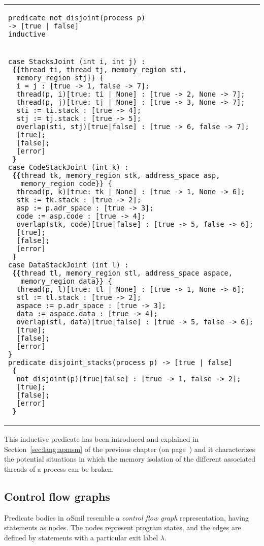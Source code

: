 \documentclass[11pt]{article}
\def\asmil{\textsf{$\alpha$Smil}}
\begin{document}
\begin{longtable}{l}
\toprule
\begin{lstlisting}
predicate not_disjoint(process p)
-> [true | false] 
inductive
\end{lstlisting}\\
\begin{lstlisting}
case StacksJoint (int i, int j) : 
 {{thread ti, thread tj, memory_region sti, 
  memory_region stj}} {
  i = j : [true -> 1, false -> 7];
  thread(p, i)[true: ti | None] : [true -> 2, None -> 7]; 
  thread(p, j)[true: tj | None] : [true -> 3, None -> 7];
  sti := ti.stack : [true -> 4];
  stj := tj.stack : [true -> 5];
  overlap(sti, stj)[true|false] : [true -> 6, false -> 7];
  [true];
  [false];
  [error]
 }
case CodeStackJoint (int k) : 
 {{thread tk, memory_region stk, address_space asp, 
   memory_region code}} {
  thread(p, k)[true: tk | None] : [true -> 1, None -> 6];
  stk := tk.stack : [true -> 2];
  asp := p.adr_space : [true -> 3];
  code := asp.code : [true -> 4];
  overlap(stk, code)[true|false] : [true -> 5, false -> 6];
  [true];
  [false];
  [error]
 }
case DataStackJoint (int l) : 
 {{thread tl, memory_region stl, address_space aspace, 
   memory_region data}} {
  thread(p, l)[true: tl | None] : [true -> 1, None -> 6];	
  stl := tl.stack : [true -> 2]; 
  aspace := p.adr_space : [true -> 3];
  data := aspace.data : [true -> 4];
  overlap(stl, data)[true|false] : [true -> 5, false -> 6];
  [true]; 
  [false];
  [error]
}
predicate disjoint_stacks(process p) -> [true | false]
 {
  not_disjoint(p)[true|false] : [true -> 1, false -> 2];
  [true];
  [false];
  [error]
 }
\end{lstlisting}\\
\bottomrule
\end{longtable}

This inductive predicate has been introduced and explained in
Section~\ref{sec:lang:apmsm} of the previous chapter (on
page~\pageref{ch3:inductiveexsmart}) and it characterizes the potential
situations in which the memory isolation of the different associated threads of
a process can be broken.

\subsection{Control flow graphs}
Predicate bodies in {\asmil} resemble a \emph{control flow graph}
representation, having statements as nodes. The nodes represent program states, 
and the edges are defined by statements with a particular exit label $\lambda$.
\end{document}

